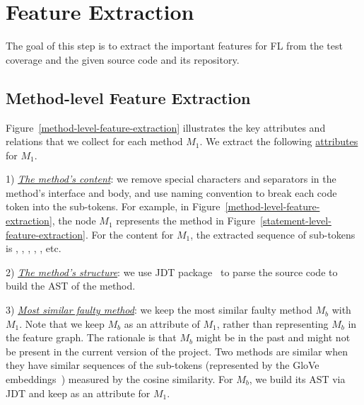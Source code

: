 \section{Feature Extraction}
\label{feature-extract:sec}


The goal of this step is to extract the important features for FL from
the test coverage and the given source code and its repository.




\subsection{Method-level Feature Extraction}

Figure~\ref{method-level-feature-extraction} illustrates the key
attributes and relations that we collect for each method $M_1$. We
extract the following \underline{attributes} for
$M_1$.

1) {\em \underline{The method's content}}: we remove special
characters and separators in the method's interface and body, and use
naming convention to break each code token into the sub-tokens. For
example, in Figure~\ref{method-level-feature-extraction}, the node
$M_1$ represents the method  in
Figure~\ref{statement-level-feature-extraction}. For the content for
$M_1$, the extracted sequence of sub-tokens is ,
, , , ,
etc.

2) {\em \underline{The method's structure}}: we use JDT
package~\cite{JDT} to parse the source code to build the AST of the
method.

3) {\em \underline{Most similar faulty method}}: we keep the most
similar faulty method $M_b$ with $M_1$. Note that we keep $M_b$ as an
attribute of $M_1$, rather than representing $M_b$ in the feature
graph. The rationale is that $M_b$ might be in the past and might not
be present in the current version of the project. Two methods are
similar when they have similar sequences of the sub-tokens
(represented by the GloVe embeddings~\cite{glove2014}) measured by the
cosine similarity.  For $M_b$, we build its AST via JDT and keep as an
attribute for $M_1$.

